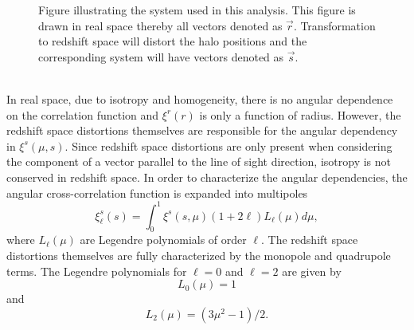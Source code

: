 \begin{figure}
    
    \caption{Figure illustrating the system used in this analysis. This
    figure is drawn in real space thereby all vectors denoted as $\vec{r}$.
    Transformation to redshift space will distort the halo positions and the
    corresponding system will have vectors denoted as $\vec{s}$.}
    \label{fig:corrpair}
\end{figure}
\\\indent
In real space, due to isotropy and homogeneity, there is no angular dependence on the correlation function and $\xi^r(r)$ is only a function of radius. However, the redshift space distortions themselves are responsible for the angular dependency in $\xi^s(\mu,s)$. Since redshift space distortions are only present when considering the component of a vector parallel to the line of sight direction, isotropy is not conserved in redshift space. In order to characterize the angular dependencies, the angular cross-correlation function is expanded into multipoles\cite{Nadathur_corr}
\begin{equation}
    \xi^s_\ell(s)=\int_0^1\xi^s(s,\mu)(1+2\ell)L_\ell(\mu)d\mu,
\end{equation}
where $L_\ell(\mu)$ are Legendre polynomials
of order $\ell$. The redshift space distortions themselves are fully characterized by the monopole and quadrupole terms\cite{Hamaus_2017}. The Legendre polynomials for $\ell=0$ and
$\ell=2$ are given by
\begin{equation}
    L_0(\mu)=1
\end{equation}
and
\begin{equation}
    L_2(\mu)=(3\mu^2-1)/2.
\end{equation}
